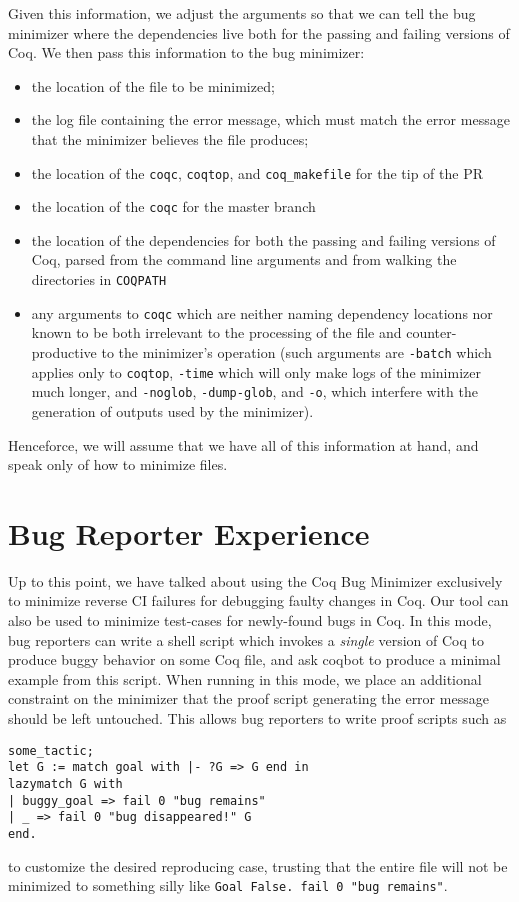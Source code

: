 \documentclass[a4paper,USenglish,cleveref,autoref,thm-restate]{lipics-v2021}
\begin{document}
Given this information, we adjust the arguments so that we can tell the bug minimizer where the dependencies live both for the passing and failing versions of Coq.
We then pass this information to the bug minimizer:
\begin{itemize}
\item the location of the file to be minimized;
\item the log file containing the error message, which must match the error message that the minimizer believes the file produces;
\item the location of the \verb|coqc|, \verb|coqtop|, and \verb|coq_makefile| for the tip of the PR
\item the location of the \verb|coqc| for the master branch
\item the location of the dependencies for both the passing and failing versions of Coq, parsed from the command line arguments and from walking the directories in \texttt{COQPATH}
\item any arguments to \verb|coqc| which are neither naming dependency locations nor known to be both irrelevant to the processing of the file and counter-productive to the minimizer's operation (such arguments are \verb|-batch| which applies only to \verb|coqtop|, \verb|-time| which will only make logs of the minimizer much longer, and \verb|-noglob|, \verb|-dump-glob|, and \verb|-o|, which interfere with the generation of outputs used by the minimizer).
\end{itemize}

Henceforce, we will assume that we have all of this information at hand, and speak only of how to minimize files.


\section{Bug Reporter Experience}
Up to this point, we have talked about using the Coq Bug Minimizer exclusively to minimize reverse CI failures for debugging faulty changes in Coq.
Our tool can also be used to minimize test-cases for newly-found bugs in Coq.
In this mode, bug reporters can write a shell script which invokes a \emph{single} version of Coq to produce buggy behavior on some Coq file, and ask coqbot to produce a minimal example from this script.
When running in this mode, we place an additional constraint on the minimizer that the proof script generating the error message should be left untouched.
This allows bug reporters to write proof scripts such as
\begin{verbatim}
some_tactic;
let G := match goal with |- ?G => G end in
lazymatch G with
| buggy_goal => fail 0 "bug remains"
| _ => fail 0 "bug disappeared!" G
end.
\end{verbatim}
to customize the desired reproducing case, trusting that the entire file will not be minimized to something silly like \verb|Goal False. fail 0 "bug remains"|.
\end{document}
